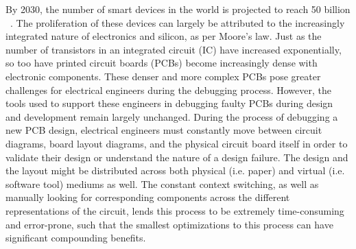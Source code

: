 \documentclass [11pt, proquest] {uwthesis}[2020/02/24]
\begin{document}
By 2030, the number of smart devices in the world is projected to reach 50 billion ~\cite{Mercer2019InternetRevenue}.
The proliferation of these devices can largely be attributed to the increasingly integrated nature of electronics and silicon, as per Moore's law.
Just as the number of transistors in an integrated circuit (IC) have increased exponentially, so too have printed circuit boards (PCBs) become increasingly dense with electronic components.
These denser and more complex PCBs pose greater challenges for electrical engineers during the debugging process.
However, the tools used to support these engineers in debugging faulty PCBs during design and development remain largely unchanged.
During the process of debugging a new PCB design, electrical engineers must constantly move between circuit diagrams, board layout diagrams, and the physical circuit board itself in order to validate their design or understand the nature of a design failure.
The design and the layout might be distributed across both physical (i.e. paper) and virtual (i.e. software tool) mediums as well.
The constant context switching, as well as manually looking for corresponding components across the different representations of the circuit, lends this process to be extremely time-consuming and error-prone, such that the smallest optimizations to this process can have significant compounding benefits.
\end{document}
